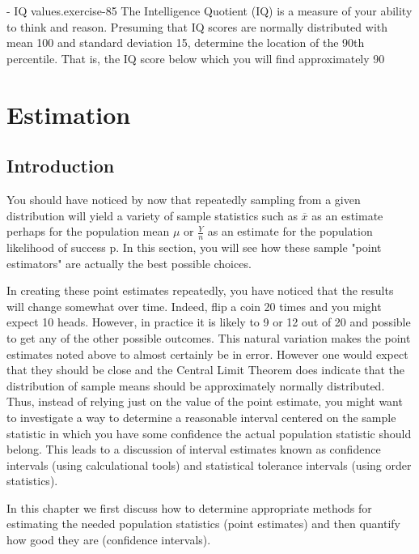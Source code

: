 \documentclass[10pt,]{book}
\numberwithin{equation}{section}
\begin{document}
\begin{inlineexercise}{- IQ values.}{exercise-85}%
\hypertarget{p-1247}{}%
The Intelligence Quotient (IQ) is a measure of your ability to think and reason. Presuming that IQ scores are normally distributed with mean 100 and standard deviation 15, determine the location of the 90th percentile.  That is, the IQ score below which you will find approximately 90%
\end{inlineexercise}
%
%
\typeout{************************************************}
\typeout{************************************************}
%
\chapter[{Estimation}]{Estimation}\label{IntervalEstimation}
%
%
\typeout{************************************************}
\typeout{************************************************}
%
\section[{Introduction}]{Introduction}\label{section-65}
\hypertarget{p-1248}{}%
You should have noticed by now that repeatedly sampling from a given distribution will yield a variety of sample statistics such as \(\overline{x}\) as an estimate perhaps for the population mean \(\mu\) or \(\frac{Y}{n}\) as an estimate for the population likelihood of success p. In this section, you will see how these sample "point estimators" are actually the best possible choices.%
\par
\hypertarget{p-1249}{}%
In creating these point estimates repeatedly, you have noticed that the results will change somewhat over time. Indeed, flip a coin 20 times and you might expect 10 heads. However, in practice it is likely to 9 or 12 out of 20 and possible to get any of the other possible outcomes. This natural variation makes the point estimates noted above to almost certainly be in error. However one would expect that they should be close and the Central Limit Theorem does indicate that the distribution of sample means should be approximately normally distributed. Thus, instead of relying just on the value of the point estimate, you might want to investigate a way to determine a reasonable interval centered on the sample statistic in which you have some confidence the actual population statistic should belong. This leads to a discussion of interval estimates known as confidence intervals (using calculational tools) and statistical tolerance intervals (using order statistics).%
\par
\hypertarget{p-1250}{}%
In this chapter we first discuss how to determine appropriate methods for estimating the needed population statistics (point estimates) and then quantify how good they are (confidence intervals).%
%
%
\typeout{************************************************}
\typeout{************************************************}
%
\end{document}
